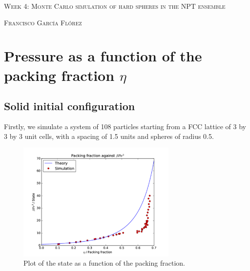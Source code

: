 \documentclass[10 pt]{article}
\begin{document}

\begin{center}
  \Large \textsc{Week 4: Monte Carlo simulation of hard spheres in the NPT ensemble}
\end{center}

\begin{center}
  \large \textsc{Francisco García Flórez}
\end{center}

\section{Pressure as a function of the packing fraction $\eta$}

\subsection{Solid initial configuration}

Firstly, we simulate a system of 108 particles starting from a FCC lattice of 3 by 3 by 3 unit cells, with a spacing of 1.5 units and spheres of radius 0.5.

\begin{figure}[H]
  \begin{center}
    \includegraphics[width=0.7\textwidth]{../graphs/solid.pdf}
    \caption{Plot of the state as a function of the packing fraction.}
  \end{center}
\end{figure}
\end{document}
